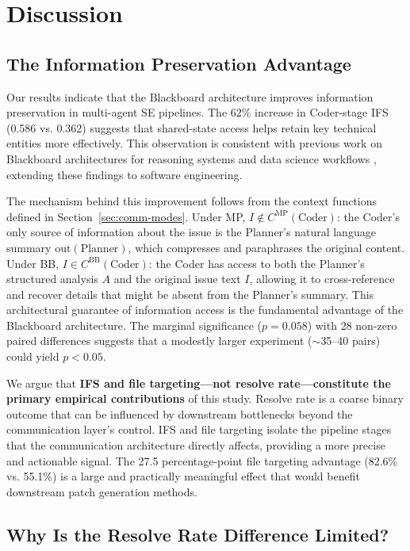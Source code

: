 \documentclass{ieeeaccess}
\begin{document}
\section{Discussion}

\subsection{The Information Preservation Advantage}

Our results indicate that the Blackboard architecture improves information preservation in multi-agent SE pipelines. The 62\% increase in Coder-stage IFS (0.586 vs. 0.362) suggests that shared-state access helps retain key technical entities more effectively. This observation is consistent with previous work on Blackboard architectures for reasoning systems \cite{wang2025lbmas} and data science workflows \cite{salemi2025llm}, extending these findings to software engineering.

The mechanism behind this improvement follows from the context functions defined in Section~\ref{sec:comm-modes}. Under MP, $I \notin C^{\text{MP}}(\text{Coder})$: the Coder's only source of information about the issue is the Planner's natural language summary $\text{out}(\text{Planner})$, which compresses and paraphrases the original content. Under BB, $I \in C^{\text{BB}}(\text{Coder})$: the Coder has access to both the Planner's structured analysis $A$ and the original issue text $I$, allowing it to cross-reference and recover details that might be absent from the Planner's summary. This architectural guarantee of information access is the fundamental advantage of the Blackboard architecture. The marginal significance ($p=0.058$) with 28 non-zero paired differences suggests that a modestly larger experiment ($\sim$35--40 pairs) could yield $p<0.05$.

We argue that \textbf{IFS and file targeting---not resolve rate---constitute the primary empirical contributions} of this study. Resolve rate is a coarse binary outcome that can be influenced by downstream bottlenecks beyond the communication layer's control. IFS and file targeting isolate the pipeline stages that the communication architecture directly affects, providing a more precise and actionable signal. The 27.5 percentage-point file targeting advantage (82.6\% vs. 55.1\%) is a large and practically meaningful effect that would benefit downstream patch generation methods.

\subsection{Why Is the Resolve Rate Difference Limited?}
\label{sec:resolve-rate-limited}
\end{document}
